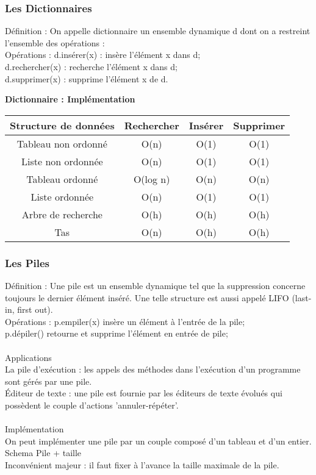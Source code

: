 \documentclass[5pt]{article}
\begin{document}
\begin{scriptsize}
\subsubsection{Les Dictionnaires }
Définition : On appelle dictionnaire un ensemble dynamique d dont on a restreint l’ensemble des opérations :\\
Opérations : d.insérer(x) : insère l’élément x dans d;\\
d.rechercher(x) : recherche l’élément x dans d;\\
d.supprimer(x) : supprime l’élément x de d.\\
\begin{center}
\textbf{Dictionnaire : Implémentation }\\
\noindent
\begin{tabular}{|c|c|c|c|}
\hline
Structure de données & Rechercher & Insérer & Supprimer \\ \hline
Tableau non ordonné & O(n) & O(1) & O(1)\\ \hline
Liste non ordonnée &  O(n) & O(1) & O(1)\\ \hline
Tableau ordonné & O(log n) & O(n) & O(n)\\ \hline
Liste ordonnée & O(n) & O(1) & O(1)\\ \hline
Arbre de recherche & O(h) & O(h) & O(h)\\ \hline
Tas & O(n) & O(h) & O(h)
\\\hline
\end{tabular} 
\end{center}
\subsubsection{Les  Piles }
Définition : Une pile est un ensemble dynamique  tel que la suppression concerne toujours le dernier élément inséré. Une telle structure est aussi appelé LIFO (last-in, first out).\\
Opérations : p.empiler(x) insère un élément à l’entrée de la pile;\\
p.dépiler() retourne et supprime l’élément en entrée de pile;\\
\\
Applications\\
La pile d’exécution : les appels des méthodes dans l’exécution d’un programme sont gérés par une pile. \\
Éditeur de texte : une pile est fournie par les éditeurs de texte évolués qui possèdent le couple d’actions 'annuler-répéter'.\\
\\
Implémentation\\
On peut implémenter une pile par un couple composé d’un tableau et d’un entier. \\
Schema Pile + taille\\
Inconvénient majeur :  il faut fixer à l’avance la taille maximale de la pile.\\

\end{scriptsize}
\end{document}
